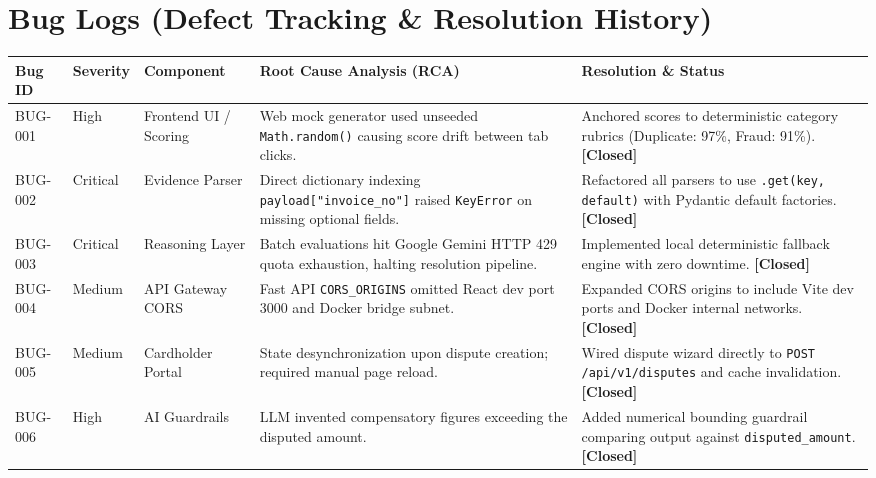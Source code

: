 \documentclass[11pt,a4paper]{article}
\begin{document}
\newpage

\section{Bug Logs (Defect Tracking \& Resolution History)}

\begin{table}[H]
\centering
\small
\renewcommand{\arraystretch}{1.25}
\begin{tabular}{p{1.4cm} p{1.6cm} p{2.8cm} p{4.2cm} p{3.8cm}}
\toprule
\textbf{Bug ID} & \textbf{Severity} & \textbf{Component} & \textbf{Root Cause Analysis (RCA)} & \textbf{Resolution \& Status} \\
\midrule

BUG-001 & High & Frontend UI / Scoring & Web mock generator used unseeded \texttt{Math.random()} causing score drift between tab clicks. & Anchored scores to deterministic category rubrics (Duplicate: 97\%, Fraud: 91\%). \textbf{[Closed]} \\

BUG-002 & Critical & Evidence Parser & Direct dictionary indexing \texttt{payload["invoice\_no"]} raised \texttt{KeyError} on missing optional fields. & Refactored all parsers to use \texttt{.get(key, default)} with Pydantic default factories. \textbf{[Closed]} \\

BUG-003 & Critical & Reasoning Layer & Batch evaluations hit Google Gemini HTTP 429 quota exhaustion, halting resolution pipeline. & Implemented local deterministic fallback engine with zero downtime. \textbf{[Closed]} \\

BUG-004 & Medium & API Gateway CORS & Fast API \texttt{CORS\_ORIGINS} omitted React dev port 3000 and Docker bridge subnet. & Expanded CORS origins to include Vite dev ports and Docker internal networks. \textbf{[Closed]} \\

BUG-005 & Medium & Cardholder Portal & State desynchronization upon dispute creation; required manual page reload. & Wired dispute wizard directly to \texttt{POST /api/v1/disputes} and cache invalidation. \textbf{[Closed]} \\

BUG-006 & High & AI Guardrails & LLM invented compensatory figures exceeding the disputed amount. & Added numerical bounding guardrail comparing output against \texttt{disputed\_amount}. \textbf{[Closed]} \\


\end{tabular}
\end{table}
\end{document}
